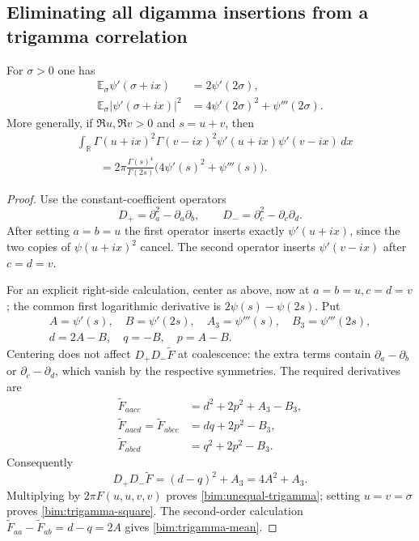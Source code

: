 \subsection{Eliminating all digamma insertions from a trigamma correlation}

\begin{theorem}\label{bim:trigamma}
For $\sigma>0$ one has
\begin{align}
 \mathbb E_\sigma\psi'(\sigma+ix)&=2\psi'(2\sigma),
                                                   \label{bim:trigamma-mean}\\
 \mathbb E_\sigma\left|\psi'(\sigma+ix)\right|^2
                  &=4\psi'(2\sigma)^2+\psi'''(2\sigma).
                                                   \label{bim:trigamma-square}
\end{align}
More generally, if $\Re u,\Re v>0$ and $s=u+v$, then
\begin{equation}\label{bim:unequal-trigamma}
\begin{split}
 &\int_{\mathbb R}\Gamma(u+ix)^2\Gamma(v-ix)^2
                         \psi'(u+ix)\psi'(v-ix)\,dx\\
 &\qquad=2\pi\frac{\Gamma(s)^4}{\Gamma(2s)}
                           \bigl(4\psi'(s)^2+\psi'''(s)\bigr).
\end{split}
\end{equation}
\end{theorem}

\begin{proof}
Use the constant-coefficient operators
\[
 D_+=\partial_a^2-\partial_a\partial_b,
 \qquad D_-=\partial_c^2-\partial_c\partial_d.
\]
After setting $a=b=u$ the first operator inserts exactly
$\psi'(u+ix)$, since the two copies of $\psi(u+ix)^2$ cancel.  The
second operator inserts $\psi'(v-ix)$ after $c=d=v$.

For an explicit right-side calculation, center as above, now at
$a=b=u,c=d=v$; the common first logarithmic derivative is
$2\psi(s)-\psi(2s)$.  Put
\[
 \begin{gathered}
 A=\psi'(s),\quad B=\psi'(2s),\quad
 A_3=\psi'''(s),\quad B_3=\psi'''(2s),\\
 d=2A-B,\quad q=-B,\quad p=A-B.
 \end{gathered}
\]
Centering does not affect $D_+D_-\widetilde F$ at coalescence: the extra
terms contain $\partial_a-\partial_b$ or
$\partial_c-\partial_d$, which vanish by the respective symmetries.
The required derivatives are
\begin{align*}
 \widetilde F_{aacc}&=d^2+2p^2+A_3-B_3,\\
 \widetilde F_{aacd}=\widetilde F_{abcc}&=dq+2p^2-B_3,\\
 \widetilde F_{abcd}&=q^2+2p^2-B_3.
\end{align*}
Consequently
\[
 D_+D_-\widetilde F=(d-q)^2+A_3=4A^2+A_3.
\]
Multiplying by $2\pi F(u,u,v,v)$ proves
\eqref{bim:unequal-trigamma}; setting $u=v=\sigma$ proves
\eqref{bim:trigamma-square}.  The second-order calculation
$\widetilde F_{aa}-\widetilde F_{ab}=d-q=2A$ gives
\eqref{bim:trigamma-mean}.
\end{proof}

